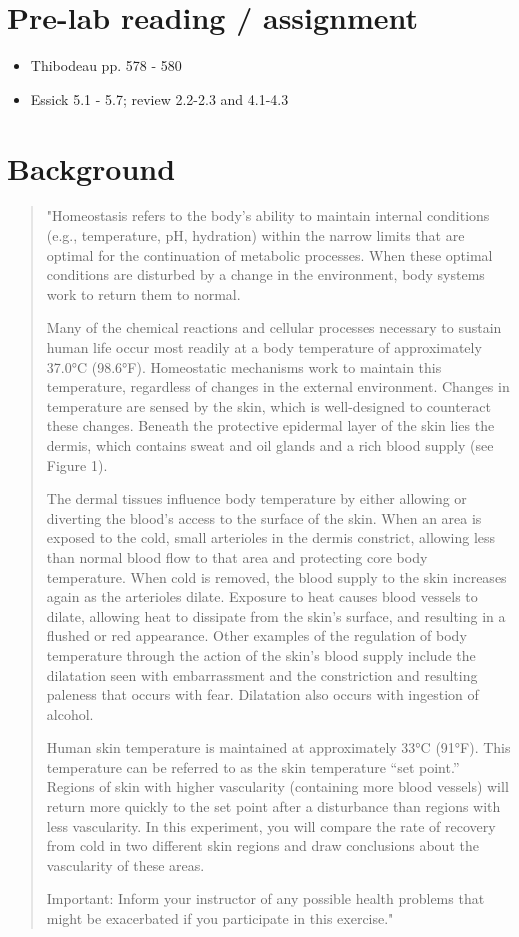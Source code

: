 \documentclass[12pt,oneside]{article}
\begin{document}
\section{Pre-lab reading / assignment}
\begin{itemize}
\item Thibodeau pp. 578 - 580
\item Essick 5.1 - 5.7; review 2.2-2.3 and 4.1-4.3
\end{itemize}

\section{Background}
\begin{quote}
"Homeostasis refers to the body’s ability to maintain internal conditions (e.g., temperature, pH, hydration) within the narrow limits that are optimal for the continuation of metabolic processes. When these optimal conditions are disturbed by a change in the environment, body systems work to return them to normal. 

Many of the chemical reactions and cellular processes necessary to sustain human life occur most readily at a body temperature of approximately 37.0°C (98.6°F). Homeostatic mechanisms work to maintain this temperature, regardless of changes in the external environment. Changes in temperature are sensed by the skin, which is well-designed to counteract these changes. Beneath the protective epidermal layer of the skin lies the dermis, which contains sweat and oil glands and a rich blood supply (see Figure 1).

The dermal tissues influence body temperature by either allowing or diverting the blood’s access to the surface of the skin. When an area is exposed to the cold, small arterioles in the dermis constrict, allowing less than normal blood flow to that area and protecting core body temperature. When cold is removed, the blood supply to the skin increases again as the arterioles dilate. Exposure to heat causes blood vessels to dilate, allowing heat to dissipate from the skin’s surface, and resulting in a flushed or red appearance. Other examples of the regulation of body temperature through the action of the skin’s blood supply include the dilatation seen with embarrassment and the constriction and resulting paleness that occurs with fear. Dilatation also occurs with ingestion of alcohol. 

Human skin temperature is maintained at approximately 33°C (91°F). This temperature can be referred to as the skin temperature “set point.” Regions of skin with higher vascularity (containing more blood vessels) will return more quickly to the set point after a disturbance than regions with less vascularity. In this experiment, you will compare the rate of recovery from cold in two different skin regions and draw conclusions about the vascularity of these areas.

Important: Inform your instructor of any possible health problems that might be exacerbated if you participate in this exercise."
\end{quote}
\end{document}
